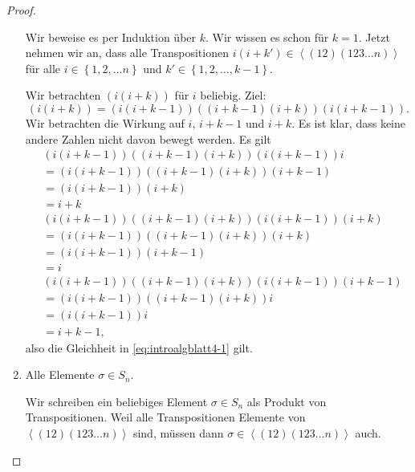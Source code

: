 \begin{proof}
\begin{enumerate}[label=(\roman*)]
			Wir beweise es per Induktion über $k$. Wir wissen es schon f\"{u}r $k=1$. Jetzt nehmen wir an, dass alle Transpositionen $i(i+k')\in \left<(12)(123\dots n) \right>$ f\"{u}r alle $i\in \left\{ 1,2,\dots n \right\} $ und $k'\in \left\{ 1,2,\dots, k-1 \right\} $.

			Wir betrachten $(i(i+k))$ f\"{u}r $i$ beliebig. Ziel:
			\begin{equation}\label{eq:introalgblatt4-1}
				(i(i+k))=(i(i+k-1))((i+k-1)(i+k))(i(i+k-1))
			.\end{equation} 
			Wir betrachten die Wirkung auf $i$, $i+k-1$ und $i+k$. Es ist klar, dass keine andere Zahlen nicht davon bewegt werden. Es gilt
\begin{align*}
	&(i(i+k-1))((i+k-1)(i+k))(i(i+k-1))i\\
	&=(i(i+k-1))((i+k-1)(i+k))(i+k-1)\\
	&=(i(i+k-1))(i+k)\\
	&= i+k\\
	&(i(i+k-1))((i+k-1)(i+k))(i(i+k-1))(i+k)\\
	&=(i(i+k-1))((i+k-1)(i+k))(i+k)\\
	&=(i(i+k-1))(i+k-1)\\
	&=i\\
	&(i(i+k-1))((i+k-1)(i+k))(i(i+k-1))(i+k-1)\\
	&=(i(i+k-1))((i+k-1)(i+k))i\\
	&=(i(i+k-1))i\\
	&=i+k-1,
\end{align*}
also die Gleichheit in \eqref{eq:introalgblatt4-1} gilt.
\item Alle Elemente $\sigma \in S_n$.

	Wir schreiben ein beliebiges Element $\sigma\in S_n$ als Produkt von Transpositionen. Weil alle Transpositionen Elemente von $\left<(12)(123\dots n) \right>$ sind, müssen dann $\sigma\in \left<(12)(123\dots n) \right>$ auch.\qedhere
	\end{enumerate}
\end{proof}
